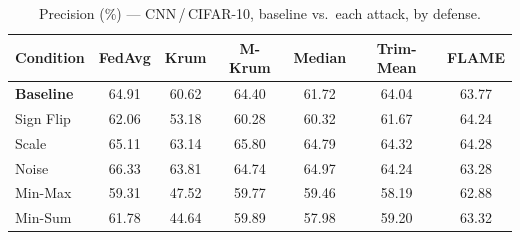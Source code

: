 \begin{table}[t]
\centering
\caption{Precision (\%) --- CNN\,/\,CIFAR-10, baseline vs.\ each attack, by defense.}
\label{tab:cnn_precision}
\footnotesize
\begin{tabular}{lcccccc}
\toprule
Condition & FedAvg & Krum & M-Krum & Median & Trim-Mean & FLAME \\
\midrule
\textbf{Baseline} & 64.91 & 60.62 & 64.40 & 61.72 & 64.04 & 63.77 \\
\midrule
Sign Flip & 62.06 & 53.18 & 60.28 & 60.32 & 61.67 & 64.24 \\
Scale & 65.11 & 63.14 & 65.80 & 64.79 & 64.32 & 64.28 \\
Noise & 66.33 & 63.81 & 64.74 & 64.97 & 64.24 & 63.28 \\
Min-Max & 59.31 & 47.52 & 59.77 & 59.46 & 58.19 & 62.88 \\
Min-Sum & 61.78 & 44.64 & 59.89 & 57.98 & 59.20 & 63.32 \\
\bottomrule
\end{tabular}
\end{table}
